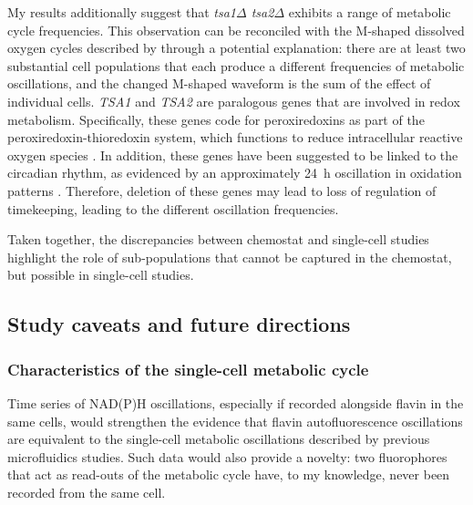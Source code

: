 My results additionally suggest that \textit{tsa1$\Delta$ tsa2$\Delta$} exhibits a range of metabolic cycle frequencies.
This observation can be reconciled with the M-shaped dissolved oxygen cycles described by \textcite{caustonMetabolicCyclesYeast2015} through a potential explanation: there are at least two substantial cell populations that each produce a different frequencies of metabolic oscillations, and the changed M-shaped waveform is the sum of the effect of individual cells.
\textit{TSA1} and \textit{TSA2} are paralogous genes that are involved in redox metabolism.
Specifically, these genes code for peroxiredoxins as part of the peroxiredoxin-thioredoxin system, which functions to reduce intracellular reactive oxygen species \parencite{wongCooperationYeastPeroxiredoxins2002}.
In addition, these genes have been suggested to be linked to the circadian rhythm, as evidenced by an approximately \SI{24}{\hour} oscillation in oxidation patterns \parencite{edgarPeroxiredoxinsAreConserved2012}.
Therefore, deletion of these genes may lead to loss of regulation of timekeeping, leading to the different oscillation frequencies.

Taken together, the discrepancies between chemostat and single-cell studies highlight the role of sub-populations that cannot be captured in the chemostat, but possible in single-cell studies.


\subsection{Study caveats and future directions}
\label{subsec:biology-discussion-caveats}


\subsubsection{Characteristics of the single-cell metabolic cycle}
\label{subsec:biology-discussion-caveats-characteristics}

Time series of NAD(P)H oscillations, especially if recorded alongside flavin in the same cells, would strengthen the evidence that flavin autofluorescence oscillations are equivalent to the single-cell metabolic oscillations described by previous microfluidics studies.
Such data would also provide a novelty: two fluorophores that act as read-outs of the metabolic cycle have, to my knowledge, never been recorded from the same cell.

